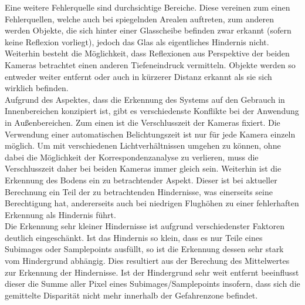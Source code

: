 \noindent
Eine weitere Fehlerquelle sind durchsichtige Bereiche. Diese vereinen zum einen Fehlerquellen, welche auch bei spiegelnden Arealen auftreten, zum anderen werden Objekte, die sich hinter einer Glasscheibe befinden zwar erkannt (sofern keine Reflexion vorliegt), jedoch das Glas als eigentliches Hindernis nicht. Weiterhin besteht die Möglichkeit, dass Reflexionen aus Perspektive der beiden Kameras betrachtet einen anderen Tiefeneindruck vermitteln. Objekte werden so entweder weiter entfernt oder auch in kürzerer Distanz erkannt als sie sich wirklich befinden.\\

\noindent
Aufgrund des Aspektes, dass die Erkennung des Systems auf den Gebrauch in Innenbereichen konzipiert ist, gibt es verschiedenste Konflikte bei der Anwendung in Außenbereichen. Zum einen ist die Verschlusszeit der Kameras fixiert. Die Verwendung einer automatischen Belichtungszeit ist nur für jede Kamera einzeln möglich. Um mit verschiedenen Lichtverhältnissen umgehen zu können, ohne dabei die Möglichkeit der Korrespondenzanalyse zu verlieren, muss die Verschlusszeit daher bei beiden Kameras immer gleich sein. Weiterhin ist die Erkennung des Bodens ein zu betrachtender Aspekt. Dieser ist bei aktueller Berechnung ein Teil der zu betrachtenden Hindernisse, was einerseits seine Berechtigung hat, andererseits auch bei niedrigen Flughöhen zu einer fehlerhaften Erkennung als Hindernis führt.\\

\noindent
Die Erkennung sehr kleiner Hindernisse ist aufgrund verschiedenster Faktoren deutlich eingeschänkt. Ist das Hindernis so klein, dass es nur Teile eines Subimages oder Samplepoints ausfüllt, so ist die Erkennung dessen sehr stark vom Hindergrund abhängig. Dies resultiert aus der Berechung des Mittelwertes zur Erkennung der Hindernisse. Ist der Hindergrund sehr weit entfernt beeinflusst dieser die Summe aller Pixel eines Subimages/Samplepoints insofern, dass sich die gemittelte Disparität nicht mehr innerhalb der Gefahrenzone befindet. 



